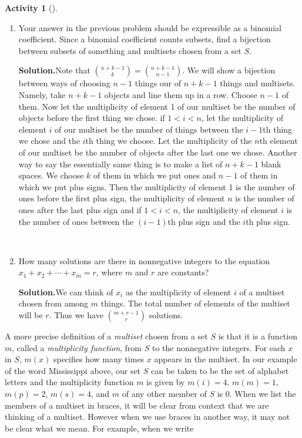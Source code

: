 \documentclass[10pt,]{book}
\theoremstyle{plain}
\theoremstyle{definition}
\newtheorem{activity}[project]{Activity}
\numberwithin{equation}{chapter}
\newcommand{\lt}{<}
\begin{document}
\begin{activity}[]\label{activity-33}
~\par
\begin{enumerate}[label=(\alph*)]
 \item Your answer in the previous problem should be expressible as a binomial coefficient. Since a binomial coefficient counts subsets, find a bijection between subsets of something and multisets chosen from a set \(S\).%
\par\medskip\noindent%
\textbf{Solution.}\quad Note that \({n+k-1\choose k} = {n+k-1 \choose n-1}\). We will show a bijection between ways of choosing \(n-1\) things our of \(n+k-1\) things and multisets. Namely, take \(n+k-1\) objects and line them up in a row. Choose \(n-1\) of them. Now let the multiplicity of element 1 of our multiset be the number of objects before the first thing we chose. if \(1\lt i\lt n\), let the multiplicity of element \(i\) of our multiset be the number of things between the \(i-1\)th thing we chose and the \(i\)th thing we choose. Let the multiplicity of the \(n\)th element of our multiset be the number of objects after the last one we chose. Another way to say the essentially same thing is to make a list of \(n+k-1\) blank spaces. We choose \(k\) of them in which we put ones and \(n-1\) of them in which we put plus signs. Then the multiplicity of element 1 is the number of ones before the first plus sign, the multiplicity of element \(n\) is the number of ones after the last plus sign and if \(1\lt i\lt n\), the multiplicity of element \(i\) is the number of ones between the \((i-1)\)th plus sign and the \(i\)th plus sign.%

~\par
\item How many solutions are there in nonnegative integers to the equation \(x_1+x_2+ \cdots +x_m = r\), where \(m\) and \(r\) are constants?%
\par\medskip\noindent%
\textbf{Solution.}\quad We can think of \(x_i\) as the multiplicity of element \(i\) of a multiset chosen from among \(m\) things. The total number of elements of the multiset will be \(r\). Thus we have \(m+r-1\choose r\) solutions.%

\end{enumerate}
\end{activity}
A more precise definition of a \emph{multiset} chosen from a set \(S\) is that it is a function \(m\), called a \emph{multiplicity function}, from \(S\) to the nonnegative integers. For each \(x\) in \(S\), \(m(x)\) specifies how many times \(x\) appears in the multiset. In our example of the word Mississippi above, our set \(S\) can be taken to be the set of alphabet letters and the multiplicity function \(m\) is given by \(m({ i})=4\), \(m({ m}) =1\), \(m({ p})=2\), \(m({ s}) =4\), and \(m\) of any other member of \(S\) is 0. When we list the members of a multiset in braces, it will be clear from context that we are thinking of a multiset. However when we use braces in another way, it may not be clear what we mean. For example, when we write%
\end{document}
